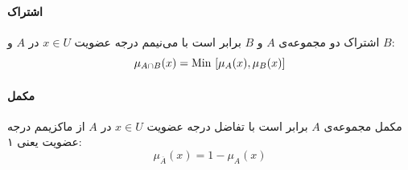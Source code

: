 \documentclass[12pt,a4paper]{article}
\theoremstyle{definition}
\begin{document}
\paragraph{ اشتراک}
اشتراک دو مجموعه‌ی $A$ و $B$ برابر است با می‌نیمم درجه عضویت $x \in U$ در $A$ و $B$:
 \begin{equation}\label{eq:e_fset_op_intersect}
 \mu_{A \cap B}(x) = {\rm Min}\ [\mu_{A}(x), \mu_{B}(x)]
 \end{equation}
 \paragraph{ مکمل}
 مکمل مجموعه‌ی $A$ برابر است با تفاضل درجه عضویت $x \in U$ در $A$ از ماکزیمم درجه عضویت یعنی ۱:
 \begin{equation}\label{eq:e_fset_op_complement}
 \mu_{\overline{A}}(x) = 1- \mu_{A}(x)
 \end{equation}
\end{document}
